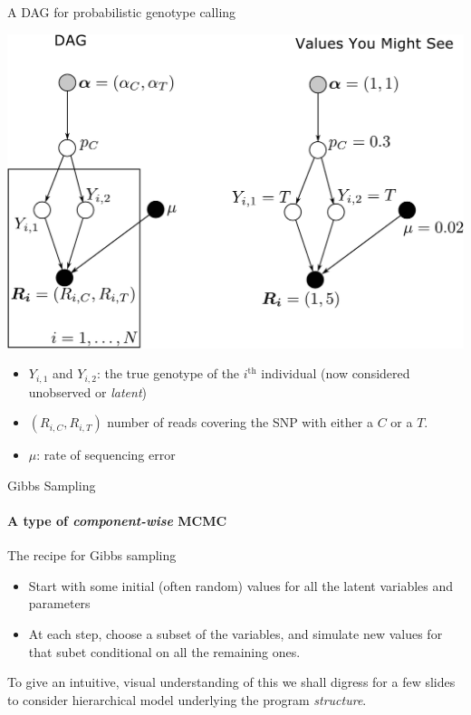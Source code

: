 \documentclass[letter,graphicx]{beamer}
\newcommand{\thh}{^\mathrm{th}}
\begin{document}
\begin{frame}{A DAG for probabilistic genotype calling}

\begin{center}
\includegraphics[width=.65\textwidth]{../diagrams/slide_genos-and-reads-dag-crop.pdf}
\end{center}
\begin{itemize}
\item $Y_{i,1}$ and $Y_{i,2}$: the true genotype of the $i\thh$ individual (now considered unobserved or {\em latent})
\item $(R_{i,C}, R_{i,T})$ number of reads covering the SNP with either a $C$ or a $T$.
\item $\mu$: rate of sequencing error
\end{itemize}
\end{frame}








\begin{frame}{Gibbs Sampling}
\framesubtitle{A type of {\em component-wise} MCMC}
The recipe for Gibbs sampling
\begin{itemize}
\item Start with some initial (often random) values for all the latent variables and parameters
\item At each step, choose a subset of the variables, and simulate new values for that subet
conditional on all the remaining ones.
\end{itemize}
To give an intuitive, visual understanding of this we shall digress for a few slides to
consider hierarchical model underlying the program {\em structure}.
\end{frame}
\end{document}

